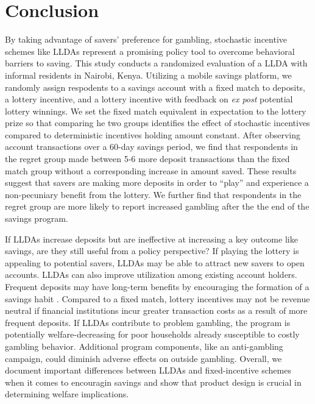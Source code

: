 \documentclass[10pt]{article}
\begin{document}
\section{Conclusion} \label{sec:conclusion}

		By taking advantage of savers' preference for gambling, stochastic incentive schemes like LLDAs represent a promising policy tool to overcome behavioral barriers to saving. This study conducts a randomized evaluation of a LLDA with informal residents in Nairobi, Kenya. Utilizing a mobile savings platform, we randomly assign respodents to a savings account with a fixed match to deposits, a lottery incentive, and a lottery incentive with feedback on \textit{ex post} potential lottery winnings. We set the fixed match equivalent in expectation to the lottery prize so that comparing he two groups identifies the effect of stochastic incentives compared to deterministic incentives holding amount constant. After observing account transactions over a 60-day savings period, we find that respondents in the regret group made between 5-6 more deposit transactions than the fixed match group without a corresponding increase in amount saved. These results suggest that savers are making more deposits in order to ``play'' and experience a non-pecuniary benefit from the lottery. We further find that respondents in the regret group are more likely to report increased gambling after the the end of the savings program.

		If LLDAs increase deposits but are ineffective at increasing a key outcome like savings, are they still useful from a policy perspective? If playing the lottery is appealing to potential savers, LLDAs may be able to attract new savers to open  accounts. LLDAs can also improve utilization among existing account holders. Frequent deposits may have long-term benefits by encouraging the formation of a savings habit . Compared to a fixed match, lottery incentives may not be revenue neutral if financial institutions incur greater transaction costs as a result of more frequent deposits. If LLDAs contribute to problem gambling, the program is potentially welfare-decreasing for poor households already susceptible to costly gambling behavior. Additional program components, like an anti-gambling campaign, could diminish adverse effects on outside gambling. Overall, we document important differences between LLDAs and fixed-incentive schemes when it comes to encouragin savings and show that product design is crucial in determining welfare implications.
\end{document}
